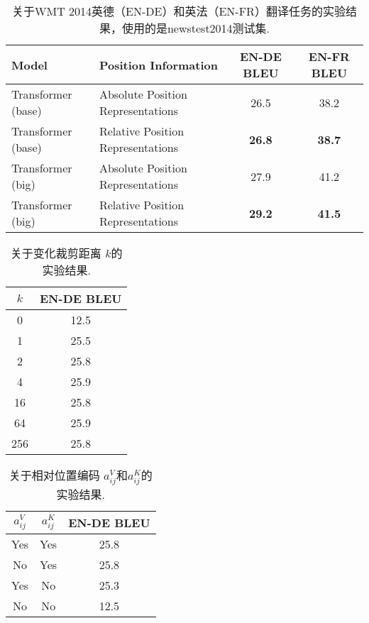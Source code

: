     \begin{table}[ht]
    \centering
    \begin{tabular}{@{}llcc@{}}
    \toprule
    \textbf{Model} & \textbf{Position Information} & \textbf{EN-DE BLEU} & \textbf{EN-FR BLEU} \\ \midrule
	Transformer (base) & Absolute Position Representations & 26.5 & 38.2 \\
	Transformer (base) & Relative Position Representations & \textbf{26.8} & \textbf{38.7} \\ \midrule
	Transformer (big) & Absolute Position Representations & 27.9 & 41.2 \\
	Transformer (big) & Relative Position Representations & \textbf{29.2} & \textbf{41.5} \\ \bottomrule
    \end{tabular}
    \caption{关于WMT 2014英德（EN-DE）和英法（EN-FR）翻译任务的实验结果，使用的是newstest2014测试集.}
    \label{tab:results1}
\end{table}

\begin{table}[ht]
    \centering
    \begin{tabular}{@{}cc@{}}
    \toprule
	$ k $ & EN-DE BLEU \\ \midrule
	0 & 12.5 \\
	1 & 25.5 \\
	2 & 25.8 \\
	4 & 25.9 \\
	16 & 25.8 \\
	64 & 25.9 \\
	256 & 25.8 \\ \bottomrule
    \end{tabular}
    \caption{关于变化裁剪距离 $ k $的实验结果.}
    \label{tab:clipping-distance-results}
\end{table}

\begin{table}[ht]
    \centering
    \begin{tabular}{@{}ccc@{}}
    \toprule
        $ a_{ij}^V $ & $ a_{ij}^K $ & EN-DE BLEU \\ \midrule
	Yes & Yes & 25.8 \\
	No & Yes & 25.8 \\
	Yes & No & 25.3 \\
	No & No & 12.5 \\ \bottomrule
    \end{tabular}
    \caption{关于相对位置编码 $ a_{ij}^V $和$ a_{ij}^K $的实验结果.}
    \label{tab:ablation-results}
\end{table}

